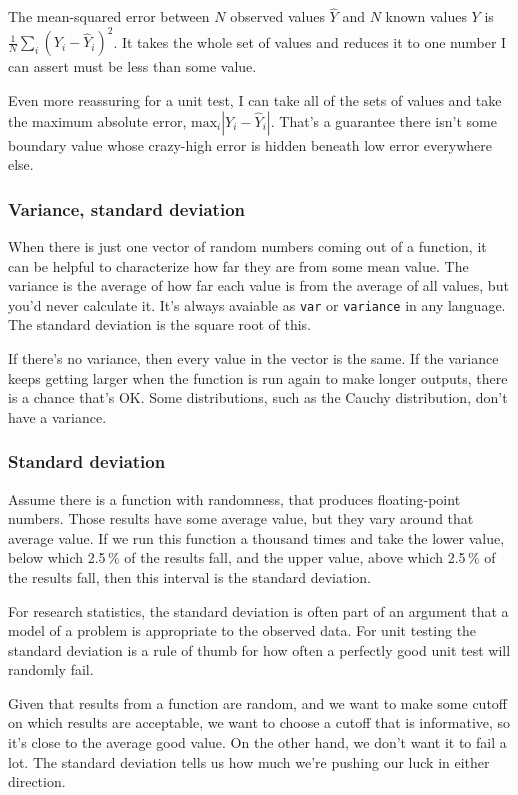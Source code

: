 \documentclass[fleqn,10pt]{olplainarticle}
\begin{document}
The mean-squared error between $N$ observed values $\hat{Y}$ and $N$ known values $Y$ is $\frac{1}{N}\sum_i (Y_i - \hat{Y}_i)^2$.
It takes the whole set of values and reduces it to one number I can assert must be less than some value.

Even more reassuring for a unit test, I can take all of the
sets of values and take the maximum absolute error,
$\mbox{max}_i |Y_i-\hat{Y}_i|$. That's a guarantee there isn't
some boundary value whose crazy-high error is hidden beneath
low error everywhere else.

\subsubsection{Variance, standard deviation}
When there is just one vector of random numbers coming out
of a function, it can be helpful to characterize how far
they are from some mean value. The variance is
the average of how far each value is from the average of all
values, but you'd never calculate it. It's always avaiable
as \lstinline!var! or \lstinline!variance! in any language.
The standard deviation is the square root of this.

If there's no variance, then every value in the vector is
the same. If the variance keeps getting larger when the
function is run again to make longer outputs, there is a
chance that's OK. Some distributions, such as the Cauchy
distribution, don't have a variance.

\subsubsection{Standard deviation}

Assume there is a function with randomness, that produces floating-point numbers. Those results
have some average value, but they vary around that average value.
If we run this function a thousand times and take the
lower value, below which 2.5\,\% of the results fall,
and the upper value, above which 2.5\,\% of the results fall,
then this interval is the standard deviation.

For research statistics, the standard deviation is often part
of an argument that a model of a problem is appropriate to
the observed data. For unit testing the standard deviation
is a rule of thumb for how often a perfectly good unit test
will randomly fail.

Given that results from a function are random, and we
want to make some cutoff on which results are acceptable,
we want to choose a cutoff that is informative, so it's
close to the average good value. On the other hand, we don't
want it to fail a lot. The standard deviation tells us
how much we're pushing our luck in either direction.
\end{document}
